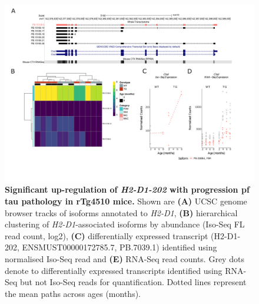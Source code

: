 \begin{landscape}
	\begin{figure}[!htp]
		\centering
		\includegraphics[page=2,trim={1.5cm 3.5cm 2cm 1cm}, scale = 0.85]{Figures/Ch5_DiffPlots_Landscape.pdf}
		\captionsetup{width=1.5\textwidth}
		\caption[Differential \textit{H2-D1} transcript expression]%
		{\textbf{Significant up-regulation of \textit{H2-D1-202} with progression pf tau pathology in rTg4510 mice.} Shown are \textbf{(A)} UCSC genome browser tracks of isoforms annotated to \textit{H2-D1}, \textbf{(B)} hierarchical clustering of \textit{H2-D1}-associated isoforms by abundance (Iso-Seq FL read count, log2), \textbf{(C)} differentially expressed transcript (H2-D1-202, ENSMUST00000172785.7, PB.7039.1) identified using normalised Iso-Seq read and \textbf{(E)} RNA-Seq read counts. Grey dots denote to differentially expressed transcripts identified using RNA-Seq but not Iso-Seq reads for quantification. Dotted lines represent the mean paths across ages (months).}   
		\label{fig:H2D1}
	\end{figure}	
\end{landscape}

